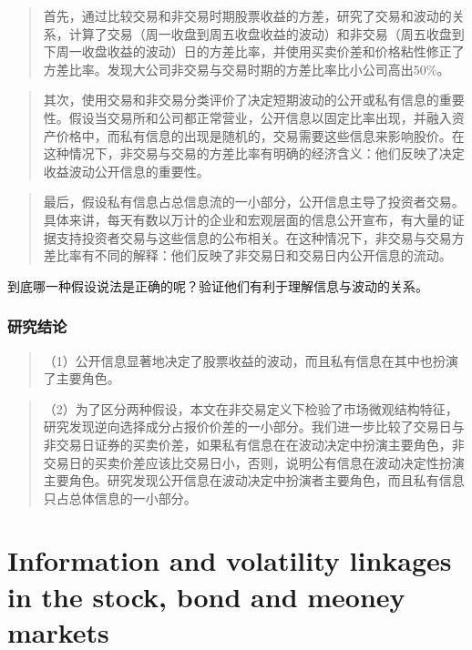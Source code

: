 \documentclass[
]{article}
\begin{document}
\begin{quote}
首先，通过比较交易和非交易时期股票收益的方差，研究了交易和波动的关系，计算了交易（周一收盘到周五收盘收益的波动）和非交易（周五收盘到下周一收盘收益的波动）日的方差比率，并使用买卖价差和价格粘性修正了方差比率。发现大公司非交易与交易时期的方差比率比小公司高出50\%。
\end{quote}

\begin{quote}
其次，使用交易和非交易分类评价了决定短期波动的公开或私有信息的重要性。假设当交易所和公司都正常营业，公开信息以固定比率出现，并融入资产价格中，而私有信息的出现是随机的，交易需要这些信息来影响股价。在这种情况下，非交易与交易的方差比率有明确的经济含义：他们反映了决定收益波动公开信息的重要性。
\end{quote}

\begin{quote}
最后，假设私有信息占总信息流的一小部分，公开信息主导了投资者交易。具体来讲，每天有数以万计的企业和宏观层面的信息公开宣布，有大量的证据支持投资者交易与这些信息的公布相关。在这种情况下，非交易与交易方差比率有不同的解释：他们反映了非交易日和交易日内公开信息的流动。
\end{quote}

到底哪一种假设说法是正确的呢？验证他们有利于理解信息与波动的关系。

\hypertarget{ux7814ux7a76ux7ed3ux8bba}{%
\subsubsection{研究结论}\label{ux7814ux7a76ux7ed3ux8bba}}

\begin{quote}
（1）公开信息显著地决定了股票收益的波动，而且私有信息在其中也扮演了主要角色。
\end{quote}

\begin{quote}
（2）为了区分两种假设，本文在非交易定义下检验了市场微观结构特征，研究发现逆向选择成分占报价价差的一小部分。我们进一步比较了交易日与非交易日证券的买卖价差，如果私有信息在在波动决定中扮演主要角色，非交易日的买卖价差应该比交易日小，否则，说明公有信息在波动决定性扮演主要角色。研究发现公开信息在波动决定中扮演者主要角色，而且私有信息只占总体信息的一小部分。
\end{quote}

\hypertarget{information-and-volatility-linkages-in-the-stock-bond-and-meoney-markets}{%
\section{Information and volatility linkages in the stock, bond and
meoney
markets}\label{information-and-volatility-linkages-in-the-stock-bond-and-meoney-markets}}
\end{document}
